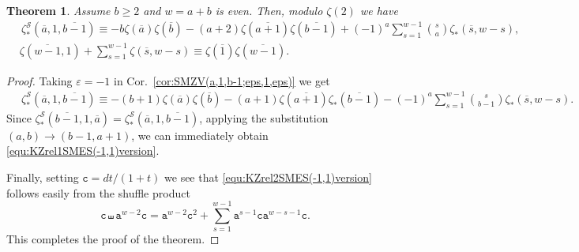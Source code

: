 \documentclass{article}
\newcommand{\sha}{\shuffle}
\newcommand{\Sy}{{\mathcal S}}
\newcommand\ta{{\texttt{a}}}
\newcommand\tc{{\texttt{c}}}
\newcommand\eps{{\varepsilon}}
\newcommand{\ol}{\overline}
\theoremstyle{plain}
\newtheorem{thm}{Theorem}[section]
\theoremstyle{definition}
\begin{document}
\begin{thm}\label{thm:effDBES(-1,1)}
Assume $b\ge 2$ and $w=a+b$ is even. Then, modulo $\zeta(2)$ we have
\begin{align}\label{equ:KZrel1SMES(-1,1)version}
&\, \zeta_\ast^\Sy(\ol{a},1,\ol{b-1})
    \equiv -b\zeta(\ol{a})\zeta(\ol{b})
            -(a+2)\zeta(\ol{a+1})\zeta(\ol{b-1})
            +(-1)^{a}\sum_{s=1}^{w-1}\binom{s}{a}\zeta_*(\ol{s},w-s),\\
&\zeta(\ol{w-1},1)+\sum_{s=1}^{w-1} \zeta(\ol{s},w-s)\equiv \zeta(\ol{1})\zeta(\ol{w-1}).\label{equ:KZrel2SMES(-1,1)version}
\end{align}
\end{thm}

\begin{proof}
Taking $\eps=-1$ in Cor.~\ref{cor:SMZV(a,1,b-1;eps,1,eps)} we get
\begin{align*}
&\, \zeta_\ast^\Sy(\ol{a},1,\ol{b-1})
\equiv -(b+1)\zeta(\ol{a})\zeta(\ol{b})
-(a+1)\zeta(\ol{a+1})\zeta_*(\ol{b-1})
-(-1)^{a}\sum_{s=1}^{w-1}\binom{s}{b-1}\zeta_*(\ol{s},w-s) .
\end{align*}
Since $\zeta_\ast^\Sy(\ol{b-1},1,\ol{a})=\zeta_\ast^\Sy(\ol{a},1,\ol{b-1})$, applying the substitution $(a,b)\to (b-1,a+1)$, we can immediately obtain \eqref{equ:KZrel1SMES(-1,1)version}.

Finally, setting $\tc=dt/(1+t)$ we see that \eqref{equ:KZrel2SMES(-1,1)version} follows easily from the shuffle product
\begin{equation*}
    \tc\sha \ta^{w-2} \tc=\ta^{w-2} \tc^2 +\sum_{s=1}^{w-1} \ta^{s-1} \tc \ta^{w-s-1} \tc.
\end{equation*}
This completes the proof of the theorem.
\end{proof}
\end{document}
